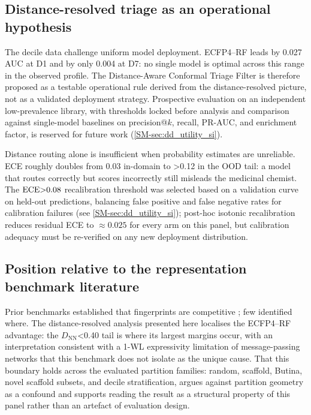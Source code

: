 \documentclass[11pt,a4paper]{article}
\begin{document}
\subsection{Distance-resolved triage as an operational hypothesis}

The decile data challenge uniform model deployment. ECFP4--RF leads by \num{0.027} AUC at D1 and by only \num{0.004} at D7: no single model is optimal across this range in the observed profile. The Distance-Aware Conformal Triage Filter is therefore proposed as a testable operational rule derived from the distance-resolved picture, not as a validated deployment strategy. Prospective evaluation on an independent low-prevalence library, with thresholds locked before analysis and comparison against single-model baselines on precision@$k$, recall, PR-AUC, and enrichment factor, is reserved for future work (\cref{SM-sec:dd_utility_si}).

Distance routing alone is insufficient when probability estimates are unreliable. ECE roughly doubles from \num{0.03} in-domain to \num{>0.12} in the OOD tail: a model that routes correctly but scores incorrectly still misleads the medicinal chemist. The $\mathrm{ECE} \num{>0.08}$ recalibration threshold was selected based on a validation curve on held-out predictions, balancing false positive and false negative rates for calibration failures (see \cref{SM-sec:dd_utility_si}); post-hoc isotonic recalibration reduces residual ECE to $\approx\num{0.025}$ for every arm on this panel, but calibration adequacy must be re-verified on any new deployment distribution.

\subsection{Position relative to the representation benchmark literature}

Prior benchmarks established that fingerprints are competitive \citep{boldini2024,guo_ding_2026,benchmark_pretrained_2025,topology_molecular_representations_2025}; few identified where. The distance-resolved analysis presented here localises the ECFP4--RF advantage: the $D_{\text{NN}}$\num{<0.40} tail is where its largest margins occur, with an interpretation consistent with a 1-WL expressivity limitation of message-passing networks that this benchmark does not isolate as the unique cause. That this boundary holds across the evaluated partition families: random, scaffold, Butina, novel scaffold subsets, and decile stratification, argues against partition geometry as a confound and supports reading the result as a structural property of this panel rather than an artefact of evaluation design.
\end{document}

